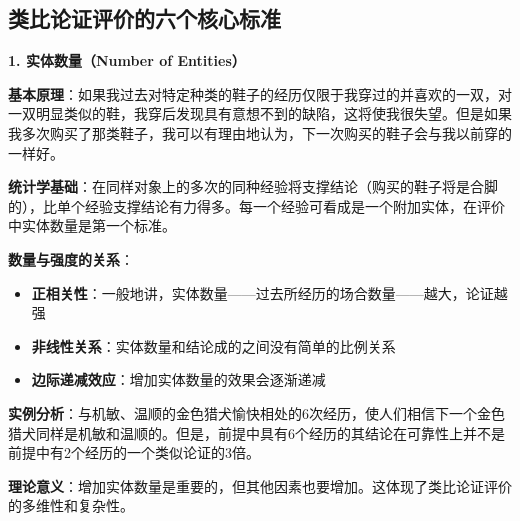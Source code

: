 \subsection{类比论证评价的六个核心标准}

\begin{theorembox}[title=标准一：实体数量的深入分析]

\textbf{1. 实体数量（Number of Entities）}

\textbf{基本原理}：如果我过去对特定种类的鞋子的经历仅限于我穿过的并喜欢的一双，对一双明显类似的鞋，我穿后发现具有意想不到的缺陷，这将使我很失望。但是如果我多次购买了那类鞋子，我可以有理由地认为，下一次购买的鞋子会与我以前穿的一样好。

\textbf{统计学基础}：在同样对象上的多次的同种经验将支撑结论（购买的鞋子将是合脚的），比单个经验支撑结论有力得多。每一个经验可看成是一个附加实体，在评价中实体数量是第一个标准。

\textbf{数量与强度的关系}：
\begin{itemize}
\item \textbf{正相关性}：一般地讲，实体数量——过去所经历的场合数量——越大，论证越强
\item \textbf{非线性关系}：实体数量和结论成的之间没有简单的比例关系
\item \textbf{边际递减效应}：增加实体数量的效果会逐渐递减
\end{itemize}

\textbf{实例分析}：与机敏、温顺的金色猎犬愉快相处的6次经历，使人们相信下一个金色猎犬同样是机敏和温顺的。但是，前提中具有6个经历的其结论在可靠性上并不是前提中有2个经历的一个类似论证的3倍。

\textbf{理论意义}：增加实体数量是重要的，但其他因素也要增加。这体现了类比论证评价的多维性和复杂性。
\end{theorembox}

